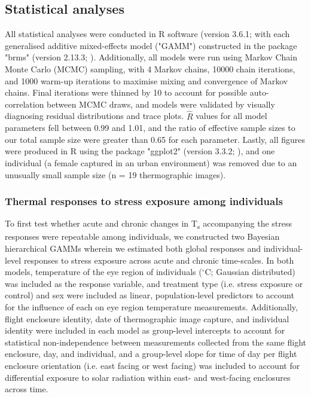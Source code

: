\documentclass[12pt]{article}
\begin{document}
\subsection{Statistical analyses}
\vspace{0.5cm}

\noindent All statistical analyses were conducted in R software (version 3.6.1; \citealt{rcore_2019} with each generalised additive mixed-effects model ("GAMM") constructed in the package "brms" (version 2.13.3; \citealt{burkner_2017}). Additionally, all models were run using Markov Chain Monte Carlo (MCMC) sampling, with 4 Markov chains, 10000 chain iterations, and 1000 warm-up iterations to maximise mixing and convergence of Markov chains. Final iterations were thinned by 10 to account for possible auto-correlation between MCMC draws, and models were validated by visually diagnosing residual distributions and trace plots. $\hat{R}$ values for all model parameters fell between 0.99 and 1.01, and the ratio of effective sample sizes to our total sample size were greater than 0.65 for each parameter. Lastly, all figures were produced in R using the package "ggplot2" (version 3.3.2; \citealt{wickham_2016}), and one individual (a female captured in an urban environment) was removed due to an unusually small sample size (n = 19 thermographic images).\vspace{0.5cm}

\subsubsection{Thermal responses to stress exposure among individuals} 
\vspace{0.5cm}

\noindent To first test whether acute and chronic changes in T\textsubscript{s} accompanying the stress responses were repeatable among individuals, we constructed two Bayesian hierarchical GAMMs wherein we estimated both global responses and individual-level responses to stress exposure across acute and chronic time-scales. In both models, temperature of the eye region of individuals ($^{\circ}$C; Gaussian distributed) was included as the response variable, and treatment type (i.e. stress exposure or control) and sex were included as linear, population-level predictors to account for the influence of each on eye region temperature measurements. Additionally, flight enclosure identity, date of thermographic image capture, and individual identity were included in each model as group-level intercepts to account for statistical non-independence between measurements collected from the same flight enclosure, day, and individual, and a group-level slope for time of day per flight enclosure orientation (i.e. east facing or west facing) was included to account for differential exposure to solar radiation within east- and west-facing enclosures across time. \vspace{1cm}
\end{document}
